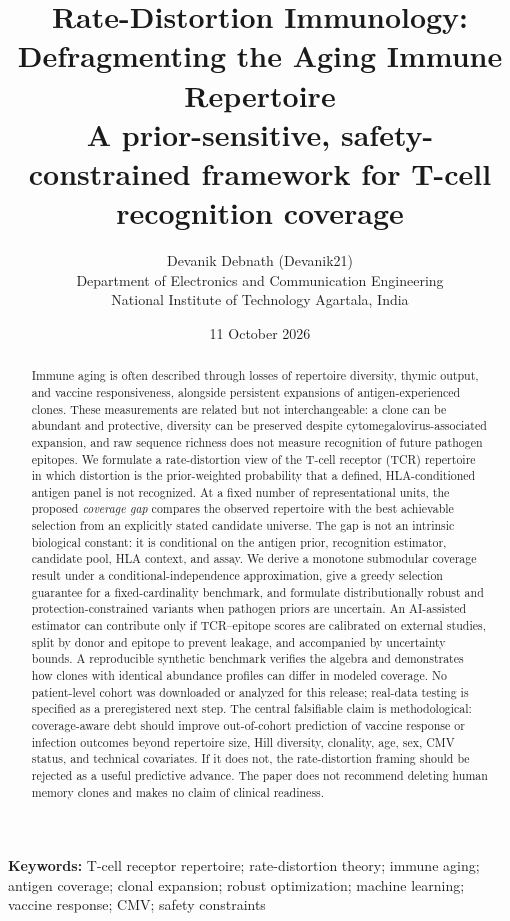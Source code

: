 \documentclass[11pt]{article}
\title{Rate-Distortion Immunology: Defragmenting the Aging Immune Repertoire\\[0.35em]\large A prior-sensitive, safety-constrained framework for T-cell recognition coverage}
\author{Devanik Debnath (Devanik21)\\\small Department of Electronics and Communication Engineering\\\small National Institute of Technology Agartala, India}
\date{11 October 2026}
\begin{document}
\maketitle
\begin{abstract}
Immune aging is often described through losses of repertoire diversity, thymic output, and vaccine responsiveness, alongside persistent expansions of antigen-experienced clones. These measurements are related but not interchangeable: a clone can be abundant and protective, diversity can be preserved despite cytomegalovirus-associated expansion, and raw sequence richness does not measure recognition of future pathogen epitopes. We formulate a rate-distortion view of the T-cell receptor (TCR) repertoire in which distortion is the prior-weighted probability that a defined, HLA-conditioned antigen panel is not recognized. At a fixed number of representational units, the proposed \emph{coverage gap} compares the observed repertoire with the best achievable selection from an explicitly stated candidate universe. The gap is not an intrinsic biological constant: it is conditional on the antigen prior, recognition estimator, candidate pool, HLA context, and assay. We derive a monotone submodular coverage result under a conditional-independence approximation, give a greedy selection guarantee for a fixed-cardinality benchmark, and formulate distributionally robust and protection-constrained variants when pathogen priors are uncertain. An AI-assisted estimator can contribute only if TCR--epitope scores are calibrated on external studies, split by donor and epitope to prevent leakage, and accompanied by uncertainty bounds. A reproducible synthetic benchmark verifies the algebra and demonstrates how clones with identical abundance profiles can differ in modeled coverage. No patient-level cohort was downloaded or analyzed for this release; real-data testing is specified as a preregistered next step. The central falsifiable claim is methodological: coverage-aware debt should improve out-of-cohort prediction of vaccine response or infection outcomes beyond repertoire size, Hill diversity, clonality, age, sex, CMV status, and technical covariates. If it does not, the rate-distortion framing should be rejected as a useful predictive advance. The paper does not recommend deleting human memory clones and makes no claim of clinical readiness.
\end{abstract}

\noindent\textbf{Keywords:} T-cell receptor repertoire; rate-distortion theory; immune aging; antigen coverage; clonal expansion; robust optimization; machine learning; vaccine response; CMV; safety constraints
\end{document}
